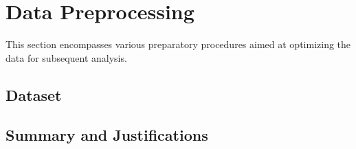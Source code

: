 \section{Data Preprocessing}\label{data_preprocessing}

This section encompasses various preparatory procedures aimed at optimizing the data for subsequent analysis. 

\subsection{Dataset}\label{dataset_given}


\subsection{Summary and Justifications}


